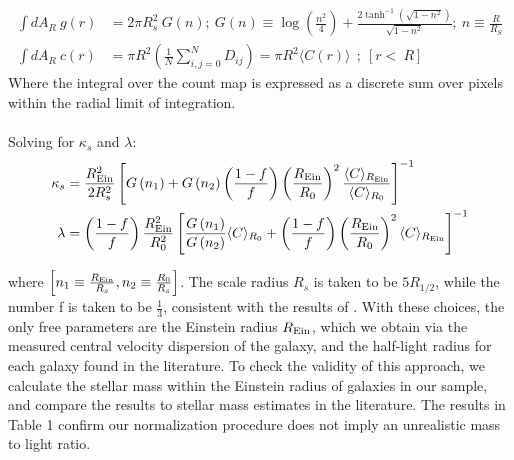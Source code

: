 \begin{align*}
\nonumber \int dA_R \ g\left(r\right) &= 2\pi R_s^2 \ G\left(n\right); \ G\left(n\right) \equiv \log\left(\frac{n^2}{4}\right)+\frac{2\tanh^{-1}\left(\sqrt{1-n^2}\right)}{\sqrt{1-n^2}}; \ n\equiv \frac{R}{R_S} \\
\nonumber 
\int dA_R \ c\left(r\right) &= \pi R^2 \left(\frac{1}{N}\sum_{i,j =0}^{N}  D_{ij}\right) =  \pi R^2 \langle C\left(r\right) \rangle \ \ ; \ \left[r< \ R\right]
\end{align*}
Where the integral over the count map is expressed as a discrete sum over pixels within the radial limit of integration. \\ \\
Solving for $\kappa_s$ and $\lambda$:
\begin{align*}
\kappa_s &= \frac{R_{\rm{Ein}}^2}{2R_s^2} \left[G\left(n_1\right)+G\left(n_2\right)\left(\frac{1-f}{f}\right)\left(\frac{R_{\rm{Ein}}}{R_0}\right)^2  \dfrac{\langle C \rangle _{R_{\rm{Ein}}}}{\langle C \rangle _{R_{0}}}\right]^{-1} \\
\lambda &= \left(\frac{1-f}{f}\right) \frac{R_{\rm{Ein}}^2}{R_0^2} \left[\frac{G\left(n_1\right)}{G\left(n_2\right)}\langle C \rangle _{R_{0}} + \left(\frac{1-f}{f}\right) \left(\frac{R_{\rm{Ein}}}{R_0}\right)^2 \langle C \rangle _{R_{\rm{Ein}}} \right]^{-1}
\end{align*}

\noindent where $\left[n_1 \equiv \frac{R_{\rm{Ein}}}{R_s}, n_2 \equiv \frac{R_0}{R_s}\right]$. The scale radius $R_s$ is taken to be $5 R_{1/2}$, while the number f is taken to be $\frac{1}{3}$, consistent with the results of \citet{Auger++10}. With these choices, the only free parameters are the Einstein radius $R_{\rm{Ein}}$, which we obtain via the measured central velocity dispersion of the galaxy, and the half-light radius for each galaxy found in the literature. To check the validity of this approach, we calculate the stellar mass within the Einstein radius of galaxies in our sample, and compare the results to stellar mass estimates in the literature. The results in Table 1 confirm our normalization procedure does not imply an unrealistic mass to light ratio. \\

